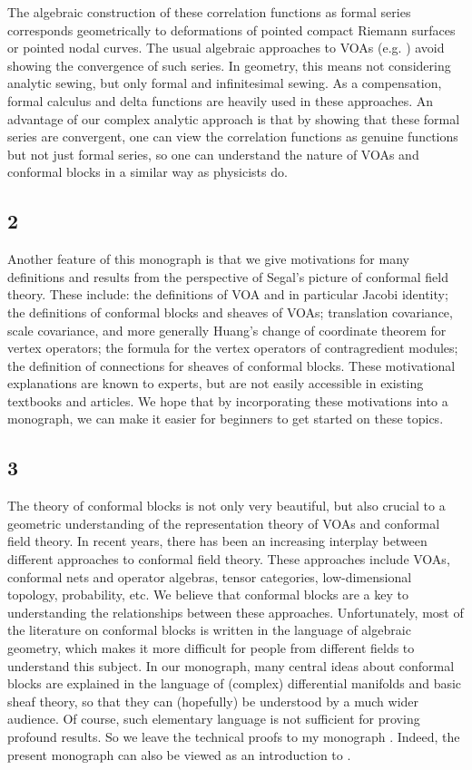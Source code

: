 \documentclass[11pt,b5paper,notitlepage]{article}
\theoremstyle{definition}
\theoremstyle{plain}
\numberwithin{equation}{section}
\begin{document}
The algebraic construction of these correlation functions as formal series corresponds geometrically to deformations of pointed compact Riemann surfaces or pointed nodal curves. The usual algebraic approaches to VOAs (e.g. \cite{Kac,LL}) avoid showing the convergence of such series. In geometry, this means not considering analytic sewing, but only formal and infinitesimal sewing. As a compensation, formal calculus and delta functions are heavily used in these approaches. An advantage of our complex analytic approach is that by showing that these formal series are convergent, one can view the correlation functions as genuine functions but not just formal series, so one can understand the nature of VOAs and conformal blocks in a similar way as physicists do. 


\subsection*{2}

Another feature of this monograph is that we give motivations for many definitions and results from the perspective of Segal's picture of conformal field theory. These include: the definitions of VOA and in particular Jacobi identity; the definitions of conformal blocks and sheaves of VOAs; translation covariance, scale covariance, and more generally Huang's change of coordinate theorem for vertex operators; the formula for the vertex operators of contragredient modules; the definition of connections for sheaves of conformal blocks. These motivational explanations are known to experts, but are not easily accessible in existing textbooks and articles. We hope that by incorporating these motivations into a monograph, we can make it easier for beginners to get started on these topics.


\subsection*{3}

The theory of conformal blocks is not only very beautiful, but also crucial to a geometric understanding of the representation theory of VOAs and conformal field theory. In recent years, there has been an increasing interplay between different approaches to conformal field theory. These approaches include VOAs, conformal nets and operator algebras, tensor categories, low-dimensional topology, probability, etc. We believe that conformal blocks are a key to understanding the relationships between these approaches. Unfortunately, most of the literature on conformal blocks is written in the language of algebraic geometry, which makes it more difficult for people from different fields to understand this subject. In our monograph, many central ideas about conformal blocks are explained in the language of (complex) differential manifolds and basic sheaf theory, so that they can (hopefully) be understood by a much wider audience. Of course, such elementary language is not sufficient for proving profound results. So we leave the technical proofs to my monograph \cite{Gui}. Indeed, the present monograph can also be viewed as an introduction to \cite{Gui}.
\end{document}

